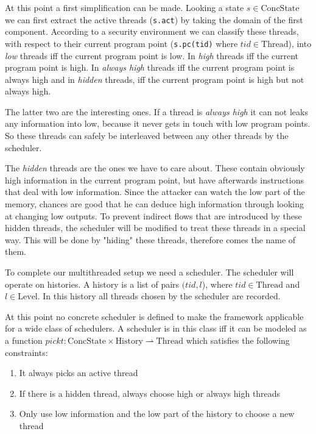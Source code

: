 \documentclass[a4paper,10pt]{llncs}
\begin{document}
At this point a first simplification can be made. Looking a state $s \in \text{ConcState}$ we can
first extract the active threads (\texttt{s.act}) by taking the domain of the first
component. According to a security environment we can classify these threads,
with respect to their current program point (\texttt{s.pc(tid)} where $tid \in \text{Thread}$),
into \textit{low} threads iff the current program point is low. In \textit{high}
threads iff the current program point is high. In \textit{always high} threads
iff the current program point is always high and in \textit{hidden} threads, iff
the current program point is high but not always high.

The latter two are the interesting ones. If a thread is \textit{always high} it
can not leaks any information into low, because it never gets in touch
with low program points. So these threads can safely be interleaved between any
other threads by the scheduler.

The \textit{hidden} threads are the ones we have to care about. These contain
obviously high information in the current program point, but have afterwards
instructions that deal with low information. Since the attacker can watch the
low part of the memory, chances are good that he can deduce high information
through looking at changing low outputs. To prevent indirect flows that are introduced by
these hidden threads, the scheduler will be modified to treat these threads
in a special way. This will be done by "hiding" these threads, therefore comes
the name of them.

To complete our multithreaded setup we need a scheduler. The scheduler will
operate on histories. A history is a list of pairs $(tid, l$), where $tid \in
\text{Thread}$ and $l \in \text{Level}$. In this history all threads chosen by the scheduler
are recorded.

At this point no concrete scheduler is defined to make the framework applicable
for a wide class of schedulers. A scheduler is in this class iff it can be
modeled as a function $pickt: \text{ConcState} \times \text{History} \rightharpoonup \text{Thread}$
which satisfies the following constraints:

\begin{enumerate}
\item It always picks an active thread
\item If there is a hidden thread, always choose high or always high threads
\item Only use low information and the low part of the history to choose a
      new thread
\end{enumerate}
\end{document}
